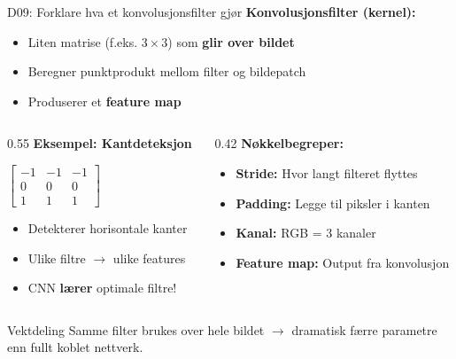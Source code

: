 \documentclass[aspectratio=169, 10pt]{beamer}
\begin{document}
\begin{frame}{D09: Forklare hva et konvolusjonsfilter gjør}
    \textbf{Konvolusjonsfilter (kernel):}
    \begin{itemize}
        \item Liten matrise (f.eks. $3 \times 3$) som \textbf{glir over bildet}
        \item Beregner punktprodukt mellom filter og bildepatch
        \item Produserer et \textbf{feature map}
    \end{itemize}
    
    \vspace{0.3cm}
    \begin{columns}[T]
        \begin{column}{0.55\textwidth}
            \textbf{Eksempel: Kantdeteksjon}
            \begin{center}
                \small
                $\begin{bmatrix} -1 & -1 & -1 \\ 0 & 0 & 0 \\ 1 & 1 & 1 \end{bmatrix}$
            \end{center}
            \begin{itemize}
                \item Detekterer horisontale kanter
                \item Ulike filtre $\rightarrow$ ulike features
                \item CNN \textbf{lærer} optimale filtre!
            \end{itemize}
        \end{column}
        \begin{column}{0.42\textwidth}
            \textbf{Nøkkelbegreper:}
            \begin{itemize}
                \item \textbf{Stride:} Hvor langt filteret flyttes
                \item \textbf{Padding:} Legge til piksler i kanten
                \item \textbf{Kanal:} RGB = 3 kanaler
                \item \textbf{Feature map:} Output fra konvolusjon
            \end{itemize}
        \end{column}
    \end{columns}
    
    \vspace{0.2cm}
    \begin{block}{\footnotesize Vektdeling}
        \footnotesize Samme filter brukes over hele bildet $\rightarrow$ dramatisk færre parametre enn fullt koblet nettverk.
    \end{block}
\end{frame}
\end{document}
